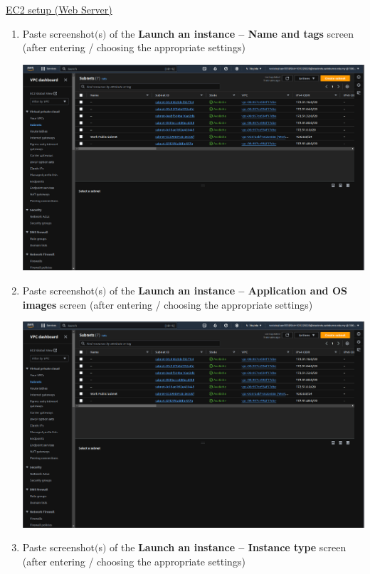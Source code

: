 \documentclass[11pt]{article}
\begin{document}
\newpage

\noindent\underline{EC2 setup (Web Server)}
\begin{enumerate}[resume]
    \item Paste screenshot$($s$)$ of the \textbf{Launch an instance – Name and tags} screen (after entering / choosing the appropriate settings) \\
    \vspace{5mm}

    {\centering
    \includegraphics[width=5.8in]{pics/4.png}
    }


    \item Paste screenshot$($s$)$ of the \textbf{Launch an instance – Application and OS images} screen (after entering / choosing the appropriate settings) \\
    \vspace{5mm}

    {\centering
    \includegraphics[width=5.8in]{pics/4.png}
    }


    \item Paste screenshot$($s$)$ of the \textbf{Launch an instance – Instance type} screen (after entering / choosing the appropriate settings) \\
    \vspace{5mm}


\end{enumerate}
\end{document}

